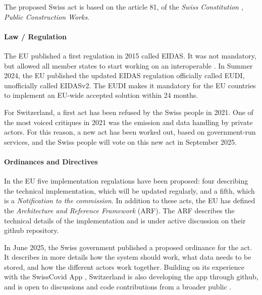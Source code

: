 The proposed Swiss \eid act is based on the article 81, of the \emph{Swiss Constitution} \cite{SwissConstitution}, \emph{Public Construction Works}.

\paragraph{Law / Regulation}

The EU published a first regulation in 2015 called EIDAS\cite{EIDAS}.
It was not mandatory, but allowed all member states to start working on an
interoperable \eid.
In Summer 2024, the EU published the updated EIDAS regulation 
officially called EUDI\cite{EUDI}, unofficially called EIDASv2.
The EUDI makes it mandatory for the EU countries to implement an EU-wide accepted
\eid solution within 24 months.

For Switzerland, a first \eid act has been refused by the Swiss people in 2021\cite{CHeID21}.
One of the most voiced critiques in 2021 was the emission and data handling by
private actors.
For this reason, a new \eid act has been worked out, based on government-run services,
and the Swiss people will vote on this new act in September 2025\cite{SwiyuAct25}.

\paragraph{Ordinances and Directives}

In the EU five implementation regulations have been proposed\cite{EUDIReg24}:
four describing the technical implementation, which will be
updated regularly, and a fifth, which is a \emph{Notification to the commission}.
In addition to these acts, the EU has defined the \emph{Architecture and Reference Framework
}(ARF)\cite{EUARF25}.
The ARF describes the technical details of the implementation and is under active
discussion on their github repository.

In June 2025, the Swiss government published a proposed ordinance for the
\eid act\cite{SwiyuOrdinance25}.
It describes in more details how the system should work, what data needs to be stored,
and how the different actors work together.
Building on its experience with the SwissCovid App \cite{SwisscovidGithub}, Switzerland is also
developing the \swiyu app through github, and is open to discussions
and code contributions from a broader public \cite{SwiyuGithub}.
